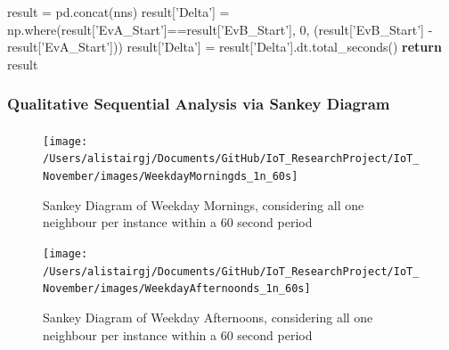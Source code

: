 \documentclass[11pt,]{article}
\newenvironment{Shaded}{\begin{snugshade}}{\end{snugshade}}
\newcommand{\ControlFlowTok}[1]{\textcolor[rgb]{0.12,0.11,0.11}{\textbf{#1}}}
\newcommand{\DecValTok}[1]{\textcolor[rgb]{0.69,0.50,0.00}{#1}}
\newcommand{\NormalTok}[1]{\textcolor[rgb]{0.12,0.11,0.11}{#1}}
\newcommand{\OperatorTok}[1]{\textcolor[rgb]{0.12,0.11,0.11}{#1}}
\newcommand{\StringTok}[1]{\textcolor[rgb]{0.75,0.01,0.01}{#1}}
\let\oldparagraph\paragraph
\renewcommand{\paragraph}[1]{\oldparagraph{#1}\mbox{}}
\begin{document}
\begin{Shaded}
\begin{Highlighting}[]
    
\NormalTok{    result }\OperatorTok{=}\NormalTok{ pd.concat(nns)}
\NormalTok{    result[}\StringTok{'Delta'}\NormalTok{] }\OperatorTok{=}\NormalTok{ np.where(result[}\StringTok{'EvA_Start'}\NormalTok{]}\OperatorTok{==}\NormalTok{result[}\StringTok{'EvB_Start'}\NormalTok{], }
                               \DecValTok{0}\NormalTok{,}
\NormalTok{                               (result[}\StringTok{'EvB_Start'}\NormalTok{] }\OperatorTok{-}\NormalTok{ result[}\StringTok{'EvA_Start'}\NormalTok{]))}
\NormalTok{    result[}\StringTok{'Delta'}\NormalTok{] }\OperatorTok{=}\NormalTok{ result[}\StringTok{'Delta'}\NormalTok{].dt.total_seconds()}
    \ControlFlowTok{return}\NormalTok{ result}
\end{Highlighting}
\end{Shaded}

\pagebreak

\hypertarget{qualitative-sequential-analysis-via-sankey-diagram}{%
\subsubsection{Qualitative Sequential Analysis via Sankey
Diagram}\label{qualitative-sequential-analysis-via-sankey-diagram}}

\hypertarget{section}{%
\paragraph{}\label{section}}

\begin{figure}[H]

{\centering \texttt{[image: /Users/alistairgj/Documents/GitHub/IoT\_ResearchProject/IoT\_November/images/WeekdayMorningds\_1n\_60s]} 

}

\caption{Sankey Diagram of Weekday Mornings, considering all one neighbour per instance within a 60 second period}\label{fig:sankey_WeekdayMorningds_1n_60s}
\end{figure}

\begin{figure}[H]

{\centering \texttt{[image: /Users/alistairgj/Documents/GitHub/IoT\_ResearchProject/IoT\_November/images/WeekdayAfternoonds\_1n\_60s]} 

}

\caption{Sankey Diagram of Weekday Afternoons, considering all one neighbour per instance within a 60 second period}\label{fig:sankey_WeekdayAfternoonds_1n_60s}
\end{figure}
\end{document}
